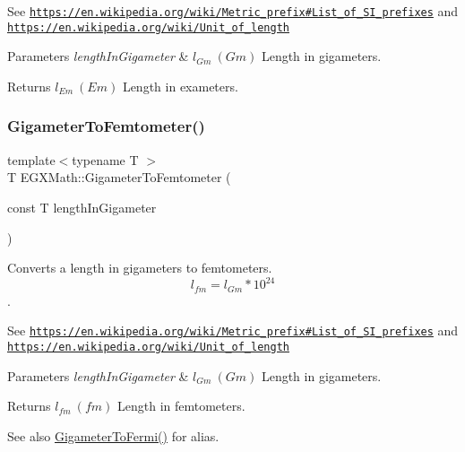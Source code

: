 See \href{https://en.wikipedia.org/wiki/Metric_prefix#List_of_SI_prefixes}{\tt https\+://en.\+wikipedia.\+org/wiki/\+Metric\+\_\+prefix\#\+List\+\_\+of\+\_\+\+S\+I\+\_\+prefixes} and \href{https://en.wikipedia.org/wiki/Unit_of_length}{\tt https\+://en.\+wikipedia.\+org/wiki/\+Unit\+\_\+of\+\_\+length} 
\begin{DoxyParams}{Parameters}
{\em length\+In\+Gigameter} & $ l_{Gm}\ (Gm)$ Length in gigameters. \\
\hline
\end{DoxyParams}
\begin{DoxyReturn}{Returns}
$ l_{Em}\ (Em)$ Length in exameters. 
\end{DoxyReturn}
\mbox{\label{group___e_g_x_math-_conversions-_length_conversions-_s_i-_gigameter-_s_i_ga6701fe7aa809ca67fef5d4f9bf7b241c}} 
\subsubsection{\texorpdfstring{Gigameter\+To\+Femtometer()}{GigameterToFemtometer()}}
{\footnotesize\ttfamily template$<$typename T $>$ \\
T E\+G\+X\+Math\+::\+Gigameter\+To\+Femtometer (\begin{DoxyParamCaption}\item[{const T}]{length\+In\+Gigameter }\end{DoxyParamCaption})}



Converts a length in gigameters to femtometers. \[ l_{fm}=l_{Gm} * 10^{24} \]. 

See \href{https://en.wikipedia.org/wiki/Metric_prefix#List_of_SI_prefixes}{\tt https\+://en.\+wikipedia.\+org/wiki/\+Metric\+\_\+prefix\#\+List\+\_\+of\+\_\+\+S\+I\+\_\+prefixes} and \href{https://en.wikipedia.org/wiki/Unit_of_length}{\tt https\+://en.\+wikipedia.\+org/wiki/\+Unit\+\_\+of\+\_\+length} 
\begin{DoxyParams}{Parameters}
{\em length\+In\+Gigameter} & $ l_{Gm}\ (Gm)$ Length in gigameters. \\
\hline
\end{DoxyParams}
\begin{DoxyReturn}{Returns}
$ l_{fm}\ (fm)$ Length in femtometers. 
\end{DoxyReturn}
\begin{DoxySeeAlso}{See also}
\mbox{\hyperlink{group___e_g_x_math-_conversions-_length_conversions-_s_i-_gigameter-_non-_s_i_gadf6d730ad6e47bc8be214f3ef59b48ca}{Gigameter\+To\+Fermi()}} for alias. 
\end{DoxySeeAlso}
\mbox{\label{group___e_g_x_math-_conversions-_length_conversions-_s_i-_gigameter-_s_i_ga25121199c511ed43c20fa9c9bdefc0ca}} 
